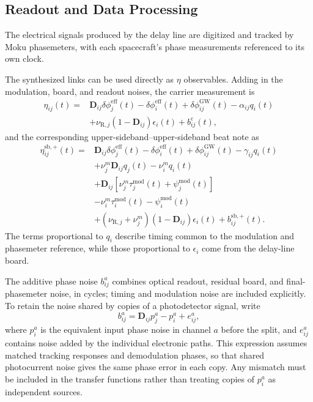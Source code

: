 \documentclass[aps,twocolumn,10pt,nofootinbib,floatfix]{revtex4-2}
\begin{document}
\subsection{Readout and Data Processing}

The electrical signals produced by the delay line are digitized and tracked by Moku phasemeters, with each spacecraft's phase measurements referenced to its own clock.

The synthesized links can be used directly as $\eta$ observables. Adding in the modulation, board, and readout noises, the carrier measurement is
\begin{align*}
    \eta_{ij}(t)
    ={}&\mathbf D_{ij}\delta\phi_j^{\mathrm{eff}}(t)-\delta\phi_i^{\mathrm{eff}}(t)
    +\delta\phi^{\mathrm{GW}}_{ij}(t)
    -\alpha_{ij}q_i(t)\\
    &+\nu_{\mathrm R,j}(1-\mathbf D_{ij})\epsilon_i(t)
    +b_{ij}^{\mathrm c}(t),
\end{align*}
and the corresponding upper-sideband--upper-sideband beat note as
\begin{align*}
    \eta_{ij}^{\mathrm{sb,+}}(t)
    ={}&\mathbf D_{ij}\delta\phi_j^{\mathrm{eff}}(t)-\delta\phi_i^{\mathrm{eff}}(t)
    +\delta\phi^{\mathrm{GW}}_{ij}(t)
    -\gamma_{ij}q_i(t)\\
    &+\nu_j^m\mathbf D_{ij}q_j(t)-\nu_i^m q_i(t)\\
    &+\mathbf D_{ij}\!\left[\nu_j^m \tau_j^{\mathrm{mod}}(t)+\psi_j^{\mathrm{mod}}(t)\right]\\
    &-\nu_i^m \tau_i^{\mathrm{mod}}(t)-\psi_i^{\mathrm{mod}}(t)\\
    &+(\nu_{\mathrm R,j}+\nu_j^m)(1-\mathbf D_{ij})\epsilon_i(t)
    +b_{ij}^{\mathrm{sb,+}}(t).
\end{align*}
The terms proportional to $q_i$ describe timing common to the modulation and phasemeter reference, while those proportional to $\epsilon_i$ come from the delay-line board.

The additive phase noise $b^a_{ij}$ combines optical readout, residual board, and final-phasemeter noise, in cycles; timing and modulation noise are included explicitly. To retain the noise shared by copies of a photodetector signal, write
\begin{equation}
    b^a_{ij}=\mathbf D_{ij}p_j^a-p_i^a+e_{ij}^a,
    \label{eq:shared_readout}
\end{equation}
where $p_i^a$ is the equivalent input phase noise in channel $a$ before the split, and $e_{ij}^a$ contains noise added by the individual electronic paths. This expression assumes matched tracking responses and demodulation phases, so that shared photocurrent noise gives the same phase error in each copy. Any mismatch must be included in the transfer functions rather than treating copies of $p_i^a$ as independent sources.
\end{document}
